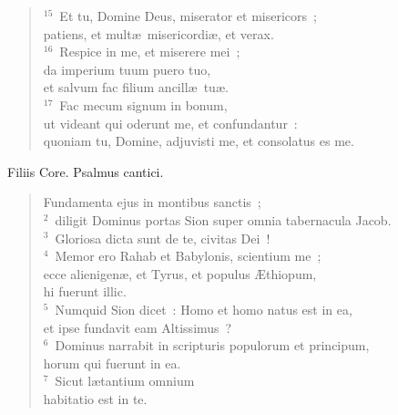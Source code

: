 \begin{flushleft}
\begin{verse}
${}^{15}$~Et tu, Domine Deus, miserator et misericors~;\\ patiens, et mult\ae\ misericordi\ae , et verax.\\
${}^{16}$~Respice in me, et miserere mei~;\\ da imperium tuum puero tuo,\\ et salvum fac filium ancill\ae\ tu\ae .\\
${}^{17}$~Fac mecum signum in bonum,\\ ut videant qui oderunt me, et confundantur~:\\ quoniam tu, Domine, adjuvisti me, et consolatus es me.\end{verse}\end{flushleft}



\lettrine[lines=3,image=true,loversize=0.05,lraise=-0.03]{F}{}iliis Core. Psalmus cantici. \begin{flushleft}\begin{verse}\vspace{6pt}Fundamenta ejus in montibus sanctis~;\\
${}^{2}$~diligit Dominus portas Sion super omnia tabernacula Jacob.\\
${}^{3}$~Gloriosa dicta sunt de te, civitas Dei~!\\
${}^{4}$~Memor ero Rahab et Babylonis, scientium me~;\\ ecce alienigen\ae , et Tyrus, et populus \AE thiopum,\\ hi fuerunt illic.\\
${}^{5}$~Numquid Sion dicet~: Homo et homo natus est in ea,\\ et ipse fundavit eam Altissimus~?\\
${}^{6}$~Dominus narrabit in scripturis populorum et principum,\\ horum qui fuerunt in ea.\\
${}^{7}$~Sicut l\ae tantium omnium\\ habitatio est in te.\end{verse}\end{flushleft}



